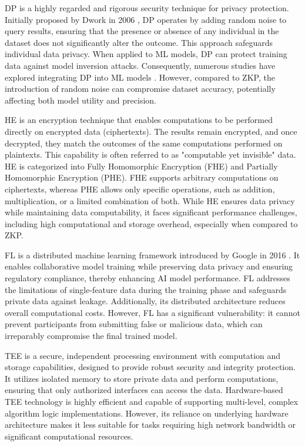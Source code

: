 \documentclass[journal]{IEEEtran}
\begin{document}
DP is a highly regarded and rigorous security technique for privacy protection. Initially proposed by Dwork in 2006 \cite{dwork2006differential}, DP operates by adding random noise to query results, ensuring that the presence or absence of any individual in the dataset does not significantly alter the outcome. This approach safeguards individual data privacy. When applied to ML models, DP can protect training data against model inversion attacks. Consequently, numerous studies have explored integrating DP into ML models \cite{dwork2008differential}. However, compared to ZKP, the introduction of random noise can compromise dataset accuracy, potentially affecting both model utility and precision.


HE \cite{yi2014homomorphic} is an encryption technique that enables computations to be performed directly on encrypted data (ciphertexts). The results remain encrypted, and once decrypted, they match the outcomes of the same computations performed on plaintexts. This capability is often referred to as "computable yet invisible" data. HE is categorized into Fully Homomorphic Encryption (FHE) and Partially Homomorphic Encryption (PHE). FHE supports arbitrary computations on ciphertexts, whereas PHE allows only specific operations, such as addition, multiplication, or a limited combination of both. While HE ensures data privacy while maintaining data computability, it faces significant performance challenges, including high computational and storage overhead, especially when compared to ZKP.

FL is a distributed machine learning framework introduced by Google in 2016 \cite{konevcny2016federated,rieke2020future}. It enables collaborative model training while preserving data privacy and ensuring regulatory compliance, thereby enhancing AI model performance. FL addresses the limitations of single-feature data during the training phase and safeguards private data against leakage. Additionally, its distributed architecture reduces overall computational costs. However, FL has a significant vulnerability: it cannot prevent participants from submitting false or malicious data, which can irreparably compromise the final trained model.


TEE \cite{sabt2015trusted} is a secure, independent processing environment with computation and storage capabilities, designed to provide robust security and integrity protection. It utilizes isolated memory to store private data and perform computations, ensuring that only authorized interfaces can access the data. Hardware-based TEE technology is highly efficient and capable of supporting multi-level, complex algorithm logic implementations. However, its reliance on underlying hardware architecture makes it less suitable for tasks requiring high network bandwidth or significant computational resources.
\end{document}
